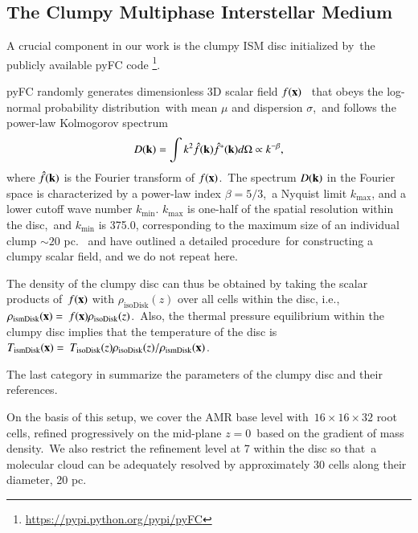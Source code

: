 \documentclass[twocolumn]{aastex631}
\begin{document}


  \subsection{The Clumpy Multiphase Interstellar Medium}

  A crucial component in our work is the clumpy ISM disc initialized by\
  the publicly available pyFC code
  \footnote{\url{https://pypi.python.org/pypi/pyFC}}.\

  pyFC randomly generates dimensionless 3D scalar field $f(\bold{x})$\ %
  that obeys the log-normal probability distribution\
  with mean $\mu$ and dispersion $\sigma$,\
  and follows the power-law Kolmogorov spectrum
  \begin{equation}
    D(\bold{k})=\int k^{2} \hat{f}(\bold{k})\hat{f}^{*}(\bold{k})d\Omega \propto k^{-\beta},
    \label{Kolmogorov-spectrum}
  \end{equation}
  where $\hat{f}(\bold{k})$ is the Fourier transform of $f(\bold{x})$.\
  The spectrum $D(\bold{k})$ in the Fourier space is characterized by a power-law index $\beta=5/3$,\
  a Nyquist limit $k_{\text{max}}$, and a lower cutoff wave number $k_{\text{min}}$.
  $k_{\text{max}}$ is one-half of the spatial resolution within the disc,\
  and $k_{\text{min}}$ is 375.0, corresponding to the maximum size of an individual clump $\sim 20$ pc.\
  \citet{LA2002} and \citet{Wagner2012} have outlined a detailed procedure\
  for constructing a clumpy scalar field, and we do not repeat here.

  The density of the clumpy disc can thus be obtained by taking the scalar products of\
  $f(\bold{x})$ with $\rho_{\text{isoDisk}}(z)$ over all cells within the disc, i.e.,\
  $\displaystyle\rho_{\text{ismDisk}}(\bold{x}) =\
  f(\bold{x}) \rho_{\text{isoDisk}}(z)$.\
  Also, the thermal pressure equilibrium within the clumpy disc implies that the temperature of the disc is
  $\displaystyle T_{\text{ismDisk}}(\bold{x}) =\
  T_{\text{isoDisk}}(z)\rho_{\text{isoDisk}}(z)/\rho_{\text{ismDisk}}(\bold{x})$.


  The last category in \Cref{table-parameters} summarize the parameters of the clumpy disc and their references.

  On the basis of this setup, we cover the AMR base level with\
  $16\times16\times32$ root cells, refined progressively on the mid-plane $z=0$\
  based on the gradient of mass density.\
  We also restrict the refinement level at 7 within the disc so that\
  a molecular cloud can be adequately resolved by approximately 30 cells along their diameter, 20 pc.
\end{document}
